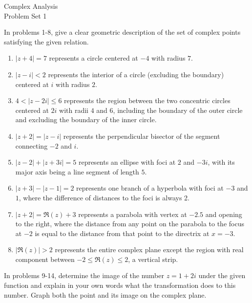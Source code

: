 \documentclass{article}
\begin{document}
    \thispagestyle{fancy}
    \begin{center}
                \LARGE{Complex Analysis \\ Problem Set 1}
    \end{center}
    \vspace{10mm}
    In problems 1-8, give a clear geometric description of the set of complex points satisfying the given relation.
    \begin{enumerate}
        \item $|z + 4| = 7$ represents a circle centered at $-4$ with radius $7$.
        \item $|z - i| < 2$ represents the interior of a circle (excluding the boundary) centered at $i$ with radius $2$.
        \item $4 < |z - 2i| \le 6$ represents the region between the two concentric circles centered at $2i$ with radii $4$ and $6$, including the boundary of the outer circle and excluding the boundary of the inner circle.
        \item $|z + 2| = |z - i|$ represents the perpendicular bisector of the segment connecting $-2$ and $i$.
        \item $|z - 2| + |z + 3i| = 5$ represents an ellipse with foci at $2$ and $-3i$, with its major axis being a line segment of length $5$.
        \item $|z + 3| - |z - 1| = 2$ represents one branch of a hyperbola with foci at $-3$ and $1$, where the difference of distances to the foci is always 2.
        \item $|z + 2| = \Re(z) + 3$ represents a parabola with vertex at $-2.5$ and opening to the right, where the distance from any point on the parabola to the focus at $-2$ is equal to the distance from that point to the directrix at $x = -3$.
        \item $|\Re(z)| > 2$ represents the entire complex plane except the region with real component between $-2 \le \Re(z) \le 2$, a vertical strip.
    \end{enumerate}
In problems 9-14, determine the image of the number $z = 1 + 2i$ under the given function and explain in your own words what the transformation does to this number. Graph both the point and its image on the complex plane.
\end{document}
